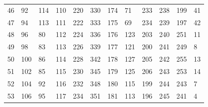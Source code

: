\begin{table}[]
\begin{tabular}{llllllllllll}
46                     & 92                     & 114                    & 110                    & 220                    & 330                    & 174                    & 71                     & 233                    & 238                    & 199                    & 41                     \\
47                     & 94                     & 113                    & 111                    & 222                    & 333                    & 175                    & 69                     & 234                    & 239                    & 197                    & 42                     \\
48                     & 96                     & 80                     & 112                    & 224                    & 336                    & 176                    & 123                    & 203                    & 240                    & 251                    & 11                     \\
49                     & 98                     & 83                     & 113                    & 226                    & 339                    & 177                    & 121                    & 200                    & 241                    & 249                    & 8                      \\
50                     & 100                    & 86                     & 114                    & 228                    & 342                    & 178                    & 127                    & 205                    & 242                    & 255                    & 13                     \\
51                     & 102                    & 85                     & 115                    & 230                    & 345                    & 179                    & 125                    & 206                    & 243                    & 253                    & 14                     \\
52                     & 104                    & 92                     & 116                    & 232                    & 348                    & 180                    & 115                    & 199                    & 244                    & 243                    & 7                      \\
53                     & 106                    & 95                     & 117                    & 234                    & 351                    & 181                    & 113                    & 196                    & 245                    & 241                    & 4                      \\

\end{tabular}
\end{table}

